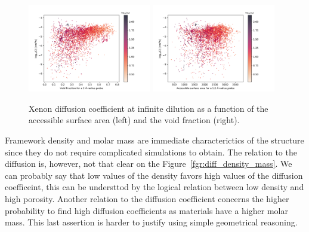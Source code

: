 \documentclass[main]{subfiles}
\begin{document}
\begin{figure}[ht]
  \centering
    \includegraphics[width=0.48\textwidth]{figures/5-diffusion/D_log-vf_2_s_+.pdf}
    \includegraphics[width=0.48\textwidth]{figures/5-diffusion/D_log-sa_12_s_+.pdf}
    \caption{Xenon diffusion coefficient at infinite dilution as a function of the accessible surface area (left) and the void fraction (right). }\label{fgr:diff_sa_vf}
\end{figure}

Framework density and molar mass are immediate characterictics of the structure since they do not require complicated simulations to obtain. The relation to the diffusion is, however, not that clear on the Figure~\ref{fgr:diff_density_mass}. We can probably say that low values of the density favors high values of the diffusion coefficeint, this can be understtod by the logical relation between low density and high porosity. Another relation to the diffusion coefficient concerns the higher probability to find high diffusion coefficients as materials have a higher molar mass. This last assertion is harder to justify using simple geometrical reasoning. 
\end{document}
